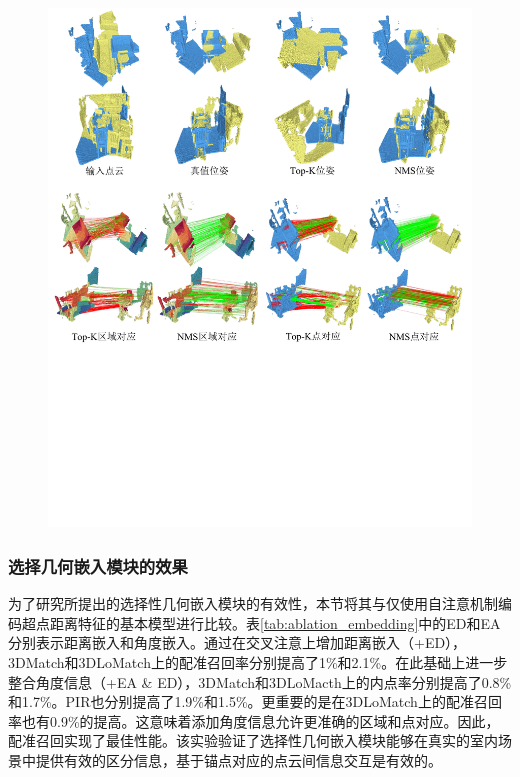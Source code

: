     \vspace{-0.1cm}
    \begin{figure}[H]
        \centering
        \includegraphics[width = \textwidth]{my/figure/3-7.pdf}
        \label{fig:anchor_way}
    \end{figure}
    \vspace{-0.35cm}

    \subsubsection{选择几何嵌入模块的效果}
    为了研究所提出的选择性几何嵌入模块的有效性，本节将其与仅使用自注意机制编码超点距离特征的基本模型进行比较。表\ref{tab:ablation_embedding}中的ED和EA分别表示距离嵌入和角度嵌入。通过在交叉注意上增加距离嵌入（+ED），3DMatch和3DLoMatch上的配准召回率分别提高了1\%和2.1\%。在此基础上进一步整合角度信息（+EA \& ED），3DMatch和3DLoMacth上的内点率分别提高了0.8\%和1.7\%。PIR也分别提高了1.9\%和1.5\%。更重要的是在3DLoMatch上的配准召回率也有0.9\%的提高。这意味着添加角度信息允许更准确的区域和点对应。因此，配准召回实现了最佳性能。该实验验证了选择性几何嵌入模块能够在真实的室内场景中提供有效的区分信息，基于锚点对应的点云间信息交互是有效的。\par
    

